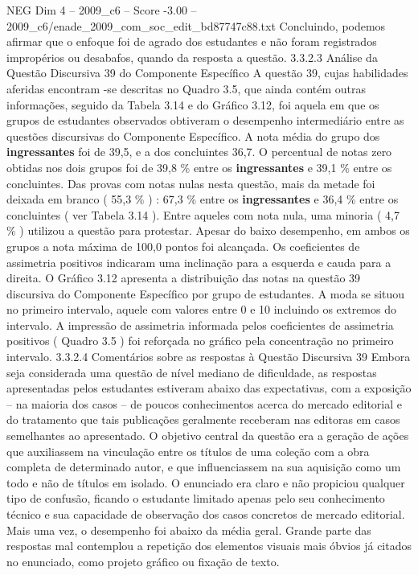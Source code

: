 \begin{textsample}{NEG Dim 4 – 2009\_c6 – Score -3.00 – 2009\_c6/enade\_2009\_com\_soc\_edit\_bd87747c88.txt}
Concluindo, podemos afirmar que o enfoque foi de agrado dos estudantes e não foram registrados impropérios ou desabafos, quando da resposta a questão. 3.3.2.3 Análise da Questão Discursiva 39 do Componente Específico A questão 39, cujas habilidades aferidas encontram -se descritas no Quadro 3.5, que ainda contém outras informações, seguido da Tabela 3.14 e do Gráfico 3.12, foi aquela em que os grupos de estudantes observados obtiveram o desempenho intermediário entre as questões discursivas do Componente Específico.
A nota média do grupo dos \textbf{ingressantes} foi de 39,5, e a dos concluintes 36,7.
O percentual de notas zero obtidas nos dois grupos foi de 39,8 \% entre os \textbf{ingressantes} e 39,1 \% entre os concluintes.
Das provas com notas nulas nesta questão, mais da metade foi deixada em branco ( 55,3 \% ) : 67,3 \% entre os \textbf{ingressantes} e 36,4 \% entre os concluintes ( ver Tabela 3.14 ).
Entre aqueles com nota nula, uma minoria ( 4,7 \% ) utilizou a questão para protestar.
Apesar do baixo desempenho, em ambos os grupos a nota máxima de 100,0 pontos foi alcançada.
Os coeficientes de assimetria positivos indicaram uma inclinação para a esquerda e cauda para a direita.
O Gráfico 3.12 apresenta a distribuição das notas na questão 39 discursiva do Componente Específico por grupo de estudantes.
A moda se situou no primeiro intervalo, aquele com valores entre 0 e 10 incluindo os extremos do intervalo.
A impressão de assimetria informada pelos coeficientes de assimetria positivos ( Quadro 3.5 ) foi reforçada no gráfico pela concentração no primeiro intervalo. 3.3.2.4 Comentários sobre as respostas à Questão Discursiva 39 Embora seja considerada uma questão de nível mediano de dificuldade, as respostas apresentadas pelos estudantes estiveram abaixo das expectativas, com a exposição – na maioria dos casos – de poucos conhecimentos acerca do mercado editorial e do tratamento que tais publicações geralmente receberam nas editoras em casos semelhantes ao apresentado.
O objetivo central da questão era a geração de ações que auxiliassem na vinculação entre os títulos de uma coleção com a obra completa de determinado autor, e que influenciassem na sua aquisição como um todo e não de títulos em isolado.
O enunciado era claro e não propiciou qualquer tipo de confusão, ficando o estudante limitado apenas pelo seu conhecimento técnico e sua capacidade de observação dos casos concretos de mercado editorial.
Mais uma vez, o desempenho foi abaixo da média geral.
Grande parte das respostas mal contemplou a repetição dos elementos visuais mais óbvios já citados no enunciado, como projeto gráfico ou fixação de texto.

\end{textsample}
